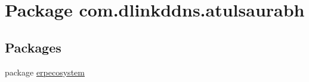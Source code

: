 \hypertarget{namespacecom_1_1dlinkddns_1_1atulsaurabh}{}\section{Package com.\+dlinkddns.\+atulsaurabh}
\label{namespacecom_1_1dlinkddns_1_1atulsaurabh}
\subsection*{Packages}
\begin{DoxyCompactItemize}
\item 
package \mbox{\hyperlink{namespacecom_1_1dlinkddns_1_1atulsaurabh_1_1erpecosystem}{erpecosystem}}
\end{DoxyCompactItemize}
